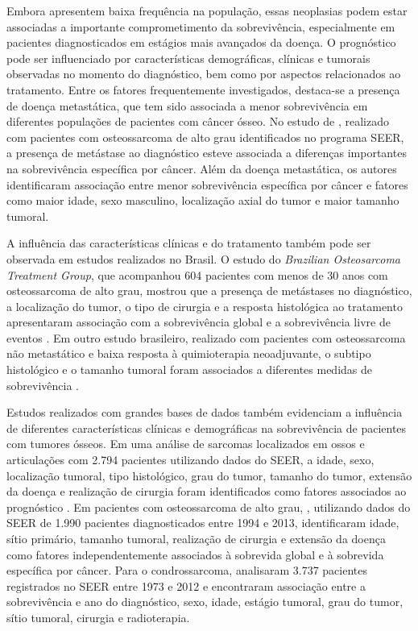 \documentclass[11pt,a4paper]{article}
\begin{document}
Embora apresentem baixa frequência na população, essas neoplasias podem estar associadas a importante comprometimento da sobrevivência, especialmente em pacientes diagnosticados em estágios mais avançados da doença. O prognóstico pode ser influenciado por características demográficas, clínicas e tumorais observadas no momento do diagnóstico, bem como por aspectos relacionados ao tratamento. Entre os fatores frequentemente investigados, destaca-se a presença de doença metastática, que tem sido associada a menor sobrevivência em diferentes populações de pacientes com câncer ósseo. No estudo de \cite{duchman2015prognostic}, realizado com pacientes com osteossarcoma de alto grau identificados no programa SEER, a presença de metástase ao diagnóstico esteve associada a diferenças importantes na sobrevivência específica por câncer. Além da doença metastática, os autores identificaram associação entre menor sobrevivência específica por câncer e fatores como maior idade, sexo masculino, localização axial do tumor e maior tamanho tumoral.

A influência das características clínicas e do tratamento também pode ser observada em estudos realizados no Brasil. O estudo do \textit{Brazilian Osteosarcoma Treatment Group}, que acompanhou 604 pacientes com menos de 30 anos com osteossarcoma de alto grau, mostrou que a presença de metástases no diagnóstico, a localização do tumor, o tipo de cirurgia e a resposta histológica ao tratamento apresentaram associação com a sobrevivência global e a sobrevivência livre de eventos \citep{petrilli2009fifteen}. Em outro estudo brasileiro, realizado com pacientes com osteossarcoma não metastático e baixa resposta à quimioterapia neoadjuvante, o subtipo histológico e o tamanho tumoral foram associados a diferentes medidas de sobrevivência \citep{bispo2009prognostic}.


Estudos realizados com grandes bases de dados também evidenciam a influência de diferentes características clínicas e demográficas na sobrevivência de pacientes com tumores ósseos. Em uma análise de sarcomas localizados em ossos e articulações com 2.794 pacientes utilizando dados do SEER, a idade, sexo, localização tumoral, tipo histológico, grau do tumor, tamanho do tumor, extensão da doença e realização de cirurgia foram identificados como fatores associados ao prognóstico \citep{zhou2023prognostic}. Em pacientes com osteossarcoma de alto grau, \cite{song2018prognostic}, utilizando dados do SEER de 1.990 pacientes diagnosticados entre 1994 e 2013, identificaram idade, sítio primário, tamanho tumoral, realização de cirurgia e extensão da doença como fatores independentemente associados à sobrevida global e à sobrevida específica por câncer. Para o condrossarcoma, \cite{nie2018prognostic} analisaram 3.737 pacientes registrados no SEER entre 1973 e 2012 e encontraram associação entre a sobrevivência e ano do diagnóstico, sexo, idade, estágio tumoral, grau do tumor, sítio tumoral, cirurgia e radioterapia. 
\end{document}
